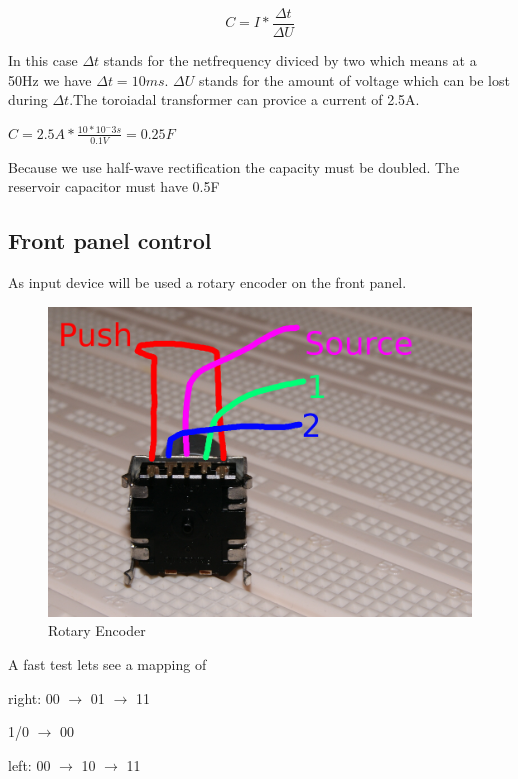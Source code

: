 \begin{equation}
	C=I*\frac{\Delta t}{\Delta U}
	\label{reservoidCapacitor}
\end{equation} 

In this case $\Delta t$ stands for the netfrequency diviced by two which means at a 50Hz we have $\Delta t = 10ms$. $\Delta U$ stands for the amount of voltage which can be lost during $\Delta t$.The toroiadal transformer can provice a current of 2.5A. 
\begin{center}
	$C=2.5A * \frac{10*10^-3s}{0.1V}=0.25F$
\end{center}
Because we use half-wave rectification the capacity must be doubled. The reservoir capacitor must have 0.5F


\subsection{Front panel control}
As input device will be used a rotary encoder on the front panel.
\begin{figure}[h!]
	\begin{center}
	\includegraphics[scale=0.5]{pictures/rotation_encoder}
	\caption{Rotary Encoder}
	\end{center}
\end{figure}

A fast test lets see a mapping of 

right: 
0\/0 $\rightarrow$ 0\/1 $\rightarrow$ 1\/1

 1/0 $\rightarrow$ 0\/0
	
left:
0\/0 $\rightarrow$ 1\/0 $\rightarrow$ 1\/1

